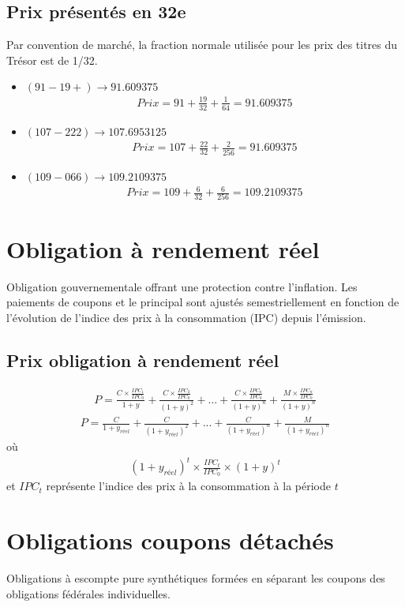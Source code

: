 \documentclass[12pt]{article}
\begin{document}
\subsection{Prix présentés en 32e}
Par convention de marché, la fraction normale utilisée pour les prix des titres du Trésor est de 1/32. 
\begin{itemize}
\item $(91-19+) \rightarrow 91.609375$
\begin{align*}
Prix=91+\frac{19}{32}+\frac{1}{64}=91.609375
\end{align*}
\item $(107-222) \rightarrow 107.6953125$
\begin{align*}
Prix=107+\frac{22}{32}+\frac{2}{256}=91.609375
\end{align*}
\item $(109-066) \rightarrow 109.2109375$
\begin{align*}
Prix=109+\frac{6}{32}+\frac{6}{256}=109.2109375
\end{align*}
\end{itemize}
\section{Obligation à rendement réel}
Obligation gouvernementale offrant une protection contre l’inflation.  Les paiements de coupons et le principal sont ajustés semestriellement en fonction de l’évolution de l’indice des prix à la consommation (IPC) depuis l’émission.
\subsection{Prix obligation à rendement réel}
\begin{align*}
P=\frac{C \times \frac{IPC_1}{IPC_0}}{1+y}+\frac{C \times \frac{IPC_2}{IPC_0}}{(1+y)^2}+...+\frac{C \times \frac{IPC_n}{IPC_0}}{(1+y)^n}+\frac{M \times \frac{IPC_n}{IPC_0}}{(1+y)^n}
\end{align*}
\begin{align*}
P=\frac{C}{1+y_{réel}}+\frac{C}{(1+y_{réel})^2}+...+\frac{C}{(1+y_{réel})^n}+\frac{M}{(1+y_{réel})^n}
\end{align*}
où
\begin{align*}
(1+y_{réel})^t \times \frac{IPC_t}{IPC_0} \times (1+y)^t
\end{align*}
et $IPC_t$ représente l'indice des prix à la consommation à la période $t$
\section{Obligations coupons détachés}
Obligations à escompte pure synthétiques formées en séparant les coupons des obligations fédérales individuelles.
\end{document}
